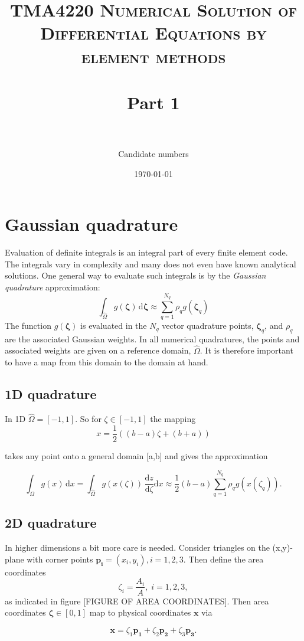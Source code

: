 \documentclass[paper=a4, fontsize=11pt]{scrartcl} %
\title{	
\normalfont \normalsize 
\textsc{TMA4220 Numerical Solution of Differential Equations by element methods} \\ [25pt] %
\horrule{0.5pt} \\[0.4cm] %
\huge Part 1 \\ %
\horrule{2pt} \\[0.5cm] %
}
\author{Candidate numbers} %
\date{\normalsize\today} %
\begin{document}
\maketitle

\section{Gaussian quadrature}
Evaluation of definite integrals is an integral part of every finite element code. The integrals vary in complexity and many does not even have known analytical solutions. One general way to evaluate such integrals is by the \textit{Gaussian quadrature} approximation:
\[ \int_{\hat{\Omega}} \! g(\mathbf{\zeta}) \, \mathrm{d}\mathbf{\zeta} \approx \sum_{q=1}^{N_q} \rho_{q}g(\mathbf{\zeta}_q)
\]
The function $g(\mathbf{\zeta})$ is evaluated in the $N_q$ vector quadrature points, $\mathbf{\zeta}_q$, and $\rho_q$ are the associated Gaussian weights. In all numerical quadratures, the points and associated weights are given on a reference domain, $\hat{\Omega}$. It is therefore important to have a map from this domain to the domain at hand.

\subsection{1D quadrature}

In 1D $\hat{\Omega}=[-1,1]$. So for $\zeta \in [-1,1]$ the mapping
\[ x=\frac{1}{2} \left((b-a) \zeta +(b+a)\right)
\]

takes any point onto a general domain [a,b] and gives the approximation

\[ \int_{\Omega} \! g(x) \, \mathrm{d}x = \int_{\hat{\Omega}} \! g\left(x(\zeta)\right) \, \frac{\mathrm{d}z}{\mathrm{d}\zeta}\mathrm{d}x \approx \frac{1}{2}(b-a) \sum_{q=1}^{N_q} \rho_{q}g(x(\zeta_q)).
\]

\subsection{2D quadrature}
In higher dimensions a bit more care is needed. Consider triangles on the (x,y)-plane with corner points $\mathbf{p_i}=(x_i,y_i), i=1,2,3$. Then define the area coordinates 
\[ \zeta_i = \frac{A_i}{A}, \; i=1,2,3,\]
as indicated in figure [FIGURE OF AREA COORDINATES]. Then area coordinates $\mathbf{\zeta} \in [0,1]$ map to physical coordinates $\mathbf{x}$ via

\[ \mathbf{x} = \zeta_1\mathbf{p_1} +\zeta_2\mathbf{p_2} +\zeta_3\mathbf{p_3}.
\]
\end{document}
